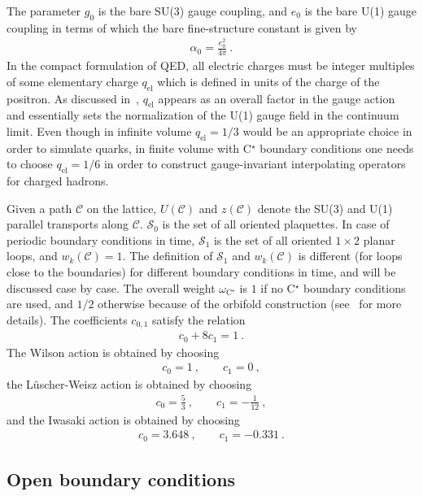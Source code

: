 \documentclass[11pt,fleqn]{article}
\begin{document}
The parameter $g_0$ is the bare SU(3) gauge coupling, and $e_0$ is the bare U(1) gauge coupling in terms of which the bare fine-structure constant is given by
\begin{gather}
   \alpha_0 = \frac{e_0^2}{4\pi} \ .
\end{gather}
In the compact formulation of QED, all electric charges must be integer multiples of some elementary charge $q_\text{el}$ which is defined in units of the charge of the positron. As discussed in~\cite{Lucini:2015hfa}, $q_\text{el}$ appears as an overall factor in the gauge action and essentially sets the normalization of the U(1) gauge field in the continuum limit. Even though in infinite volume $q_\text{el}=1/3$ would be an appropriate choice in order to simulate quarks, in finite volume with C$^\star$ boundary conditions one needs to choose $q_\text{el}=1/6$ in order to construct gauge-invariant interpolating operators for charged hadrons.

Given a path $\mathcal{C}$ on the lattice, $U(\mathcal{C})$ and $z(\mathcal{C})$ denote the SU(3) and U(1) parallel transports along $\mathcal{C}$. $\mathcal{S}_0$ is the set of all oriented plaquettes. In case of periodic boundary conditions in time, $\mathcal{S}_1$ is the set of all oriented $1 \times 2$ planar loops, and $w_k(\mathcal{C})=1$.
The definition of $\mathcal{S}_1$ and $w_k(\mathcal{C})$ is different (for loops close to the boundaries) for different boundary conditions in time, and will be discussed case by case.
The overall weight $\omega_{\text{C}^\star}$ is $1$ if no C$^\star$ boundary conditions are used, and $1/2$ otherwise because of the orbifold construction (see~\cite{cstar} for more details).
The coefficients $c_{0,1}$ satisfy the relation
\begin{gather}
   c_0 + 8c_1 = 1 \ .
\end{gather}
The Wilson action is obtained by choosing
\begin{gather}
   c_0 = 1 \ , \qquad c_1 = 0 \ ,
\end{gather}
the L\"uscher-Weisz action is obtained by choosing
\begin{gather}
   c_0 = \tfrac{5}{3} \ , \qquad c_1 = -\tfrac{1}{12} \ ,
\end{gather}
and the Iwasaki action is obtained by choosing
\begin{gather}
   c_0 = 3.648 \ , \qquad c_1 = -0.331 \ .
\end{gather}

\subsection{Open boundary conditions}
\end{document}
